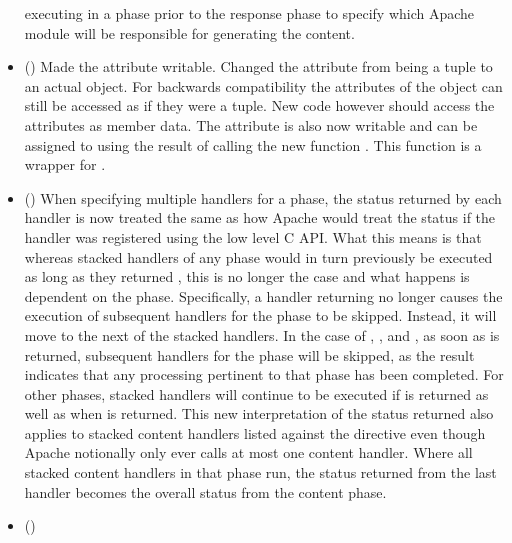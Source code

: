 \begin{itemize}
      executing in a phase prior to the response phase to specify which
      Apache module will be responsible for generating the content.
    \item
      ()
      Made the  attribute writable. Changed
      the  attribute from being a tuple to an actual object.
      For backwards compatibility the attributes of the object can still be
      accessed as if they were a tuple. New code however should access
      the attributes as member data. The  attribute is
      also now writable and can be assigned to using the result of calling
      the new function . This function is a wrapper
      for .
    \item
      ()
      When specifying multiple handlers for a phase, the status returned by
      each handler is now treated the same as how Apache would treat the
      status if the handler was registered using the low level C API. What
      this means is that whereas stacked handlers of any phase would in
      turn previously be executed as long as they returned ,
      this is no longer the case and what happens is dependent on the
      phase. Specifically, a handler returning  no
      longer causes the execution of subsequent handlers for the phase to
      be skipped. Instead, it will move to the next of the stacked
      handlers. In the case of ,
      ,  and
      , as soon as  is returned,
      subsequent handlers for the phase will be skipped, as the result
      indicates that any processing pertinent to that phase has been
      completed. For other phases, stacked handlers will continue to be
      executed if  is returned as well as when
       is returned. This new interpretation of the
      status returned also applies to stacked content handlers listed
      against the  directive even though Apache
      notionally only ever calls at most one content handler. Where all
      stacked content handlers in that phase run, the status returned from
      the last handler becomes the overall status from the content phase.
    \item
      ()

\end{itemize}
